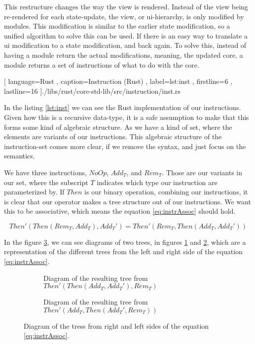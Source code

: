 This restructure changes the way the view is rendered. Instead of the view being
re-rendered for each state-update, the view, or \gls*{ui}-hierarchy, is only
modified by modules. This modification is similar to the earlier state
modification, so a unified algorithm to solve this can be used. If there is an
easy way to translate a \gls*{ui} modification to a state modification, and back
again. To solve this, instead of having a module return the actual
modifications, meaning, the updated core, a module returns a set of instructions
of what to do with the core.

\begin{code}[H]
  
   [ language=Rust
   , caption={Instruction (Rust)}
   , label=lst:inst
   , firstline=6
   , lastline=16
   ]{./libs/rust/core-std-lib/src/instruction/inst.rs}
\end{code}

In the listing \ref{lst:inst} we can see the Rust implementation of our
instructions. Given how this is a recursive data-type, it is a safe assumption
to make that this forms some kind of algebraic structure. As we have a kind of
set, where the elements are variants of our instructions. This algebraic
structure of the instruction-set comes more clear, if we remove the syntax, and
just focus on the semantics.

We have three instructions, $NoOp$, $Add_T$, and $Rem_T$. Those are our variants
in our set, where the subscript $T$ indicates which type our instruction are
parameterized by. If $Then$ is our binary operation, combining our instructions,
it is clear that our operator makes a tree structure out of our instructions. We
want this to be associative, which means the equation \ref{eq:instrAssoc} should
hold.

\begin{equation} \label{eq:instrAssoc}
  Then'(Then(Rem_T, Add_T), Add_T') = Then'(Rem_T, Then(Add_T, Add_T'))
\end{equation}

In the figure \ref{fig:instrTree}, we can see diagrams of two trees,
in figures \ref{sfig:instrTree1} and \ref{sfig:instrTree2}, which are a
representation of the different trees from the left and right side of the
equation \ref{eq:instrAssoc}.

\begin{figure}[H]
  \begin{subfigure}[h]{0.49\linewidth}
    \centering
    
    \caption{
      Diagram of the resulting tree from $Then'(Then(Add_T, Add_T'), Rem_T)$
    }
    \label{sfig:instrTree1}
  \end{subfigure}
  \hfill
  \begin{subfigure}[h]{0.49\linewidth}
    \centering
    
    \caption{
      Diagram of the resulting tree from $Then'(Add_T, Then(Add_T', Rem_T))$
    }
    \label{sfig:instrTree2}
  \end{subfigure}
  \caption{
    Diagram of the tress from right and left sides of the equation
    \ref{eq:instrAssoc}.
  }
  \label{fig:instrTree}
\end{figure}

